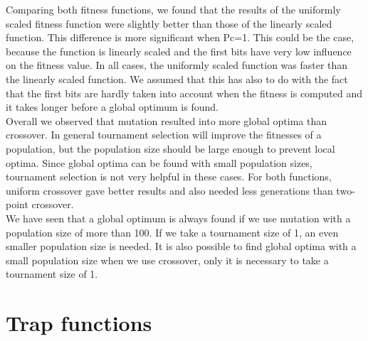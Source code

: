 \documentclass[10pt,a4paper,onecolumn]{article}
\begin{document}
Comparing both fitness functions, we found that the results of the uniformly scaled fitness function were slightly better than those of the linearly scaled function.
This difference is more significant when Pc=1.
This could be the case, because the function is linearly scaled and the first bits have very low influence on the fitness value.
In all cases, the uniformly scaled function was faster than the linearly scaled function.
We assumed that this has also to do with the fact that the first bits are hardly taken into account when the fitness is computed and it takes longer before a global optimum is found. \\

Overall we observed that mutation resulted into more global optima than crossover.
In general tournament selection will improve the fitnesses of a population, but the population size should be large enough to prevent local optima.
Since global optima can be found with small population sizes, tournament selection is not very helpful in these cases.
For both functions, uniform crossover gave better results and also needed less generations than two-point crossover. \\

We have seen that a global optimum is always found if we use mutation with a population size of more than 100. If we take a tournament size of 1, an even smaller population size is needed.
It is also possible to find global optima with a small population size when we use crossover, only it is necessary to take a tournament size of 1.

\section{Trap functions}
\end{document}
